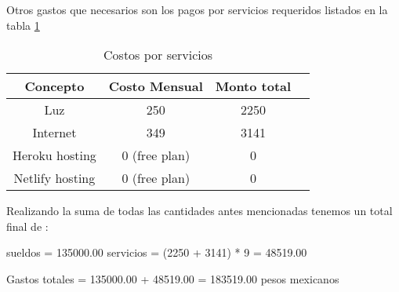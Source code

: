 Otros gastos que necesarios son los pagos por servicios requeridos listados en la tabla \ref{tab:services_costs}

\begin{table}
    \centering
    \begin{tabular}{|c|c|c|c|}
    \hline
        Concepto & Costo Mensual & Monto total \\ \hline
        Luz & 250 & 2250  \\ \hline
        Internet & 349 & 3141 \\ \hline
        Heroku hosting & 0 (free plan) & 0 \\ \hline
        Netlify hosting & 0 (free plan) & 0 \\ \hline
    \end{tabular}
    \caption{Costos por servicios}
    \label{tab:services_costs}
\end{table}

Realizando la suma de todas las cantidades antes mencionadas tenemos un total final de :

\begin{center}

	sueldos = 135000.00
	servicios = (2250 + 3141) * 9 = 48519.00

	Gastos totales = 135000.00 + 48519.00 = 183519.00 pesos mexicanos

\end{center}

